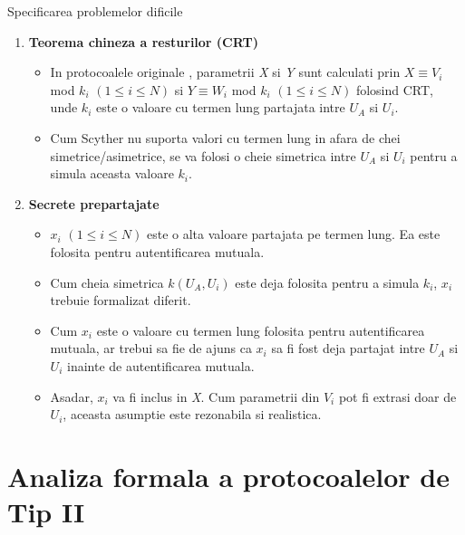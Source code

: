 \documentclass[11pt]{beamer}
\begin{document}
\begin{frame}[t,allowframebreaks]{Specificarea problemelor dificile}
\begin{enumerate}
\item \textbf{Teorema chineza a resturilor (CRT)}
	
	\begin{itemize}
	
	\item In protocoalele originale \cite{generalframework}, parametrii \textit{X} si \textit{Y} sunt calculati prin $X \equiv V_i$ mod $k_i$ $(1 \leq i \leq N)$ si $Y \equiv W_i$ mod $k_i$ $(1 \leq i \leq N)$ folosind CRT, unde $k_i$ este o valoare cu termen lung partajata intre $U_A$ si $U_i$.
	\item Cum Scyther nu suporta valori cu termen lung in afara de chei simetrice/asimetrice, se va folosi o cheie simetrica intre $U_A$ si $U_i$ pentru a simula aceasta valoare $k_i$.
	
	\end{itemize}
	
\item \textbf{Secrete prepartajate}

	\begin{itemize}
	
	\item $x_i$ $(1 \leq i \leq N)$ este o alta valoare partajata pe termen lung. Ea este folosita pentru autentificarea mutuala.
	\item Cum cheia simetrica $k(U_A,U_i)$ este deja folosita pentru a simula $k_i$, $x_i$ trebuie formalizat diferit.
	\item Cum $x_i$ este o valoare cu termen lung folosita pentru autentificarea mutuala, ar trebui sa fie de ajuns ca $x_i$ sa fi fost deja partajat intre $U_A$ si $U_i$ inainte de autentificarea mutuala.
	\item Asadar, $x_i$ va fi inclus in \textit{X}. Cum parametrii din $V_i$ pot fi extrasi doar de $U_i$, aceasta asumptie este rezonabila si realistica.
	
	\end{itemize}

\end{enumerate}

\end{frame}

\section{Analiza formala a protocoalelor de Tip II}
\end{document}
